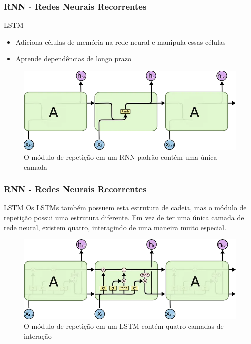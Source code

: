 \documentclass{beamer}
\begin{document}
\begin{frame}
	\frametitle{RNN - Redes Neurais Recorrentes}
	\begin{block}{LSTM}
		\begin{itemize}
			\item Adiciona células de memória na rede neural e manipula essas células
			\item Aprende dependências de longo prazo
		\end{itemize}
	\begin{figure}
		\centering
		\includegraphics[width=0.7\linewidth]{figures/lstm}
		\caption{O módulo de repetição em um RNN padrão contém uma única camada}
	\end{figure}
		
	\end{block}
\end{frame}
\begin{frame}
	\frametitle{RNN - Redes Neurais Recorrentes}
	\begin{block}{LSTM}
		Os LSTMs também possuem esta estrutura de cadeia, mas o módulo de repetição possui uma estrutura diferente. Em vez de ter uma única camada de rede neural, existem quatro, interagindo de uma maneira muito especial.
		\begin{figure}
			\centering
			\includegraphics[width=0.7\linewidth]{figures/lstm1}
			\caption{O módulo de repetição em um LSTM contém quatro camadas de interação}
		\end{figure}
		
	\end{block}
\end{frame}
\end{document}

